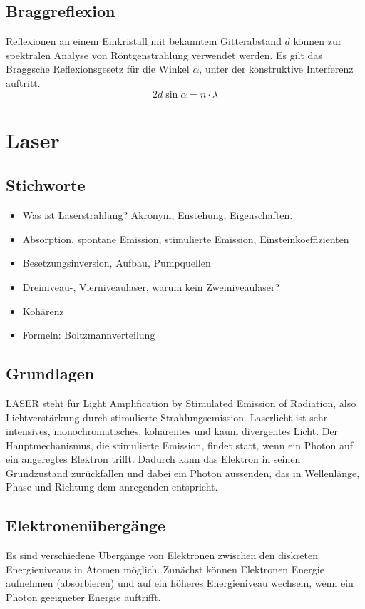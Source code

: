 \documentclass[a4paper]{scrartcl}
\begin{document}
\subsection{Braggreflexion}
Reflexionen an einem Einkristall mit bekanntem Gitterabstand $d$ können zur spektralen Analyse von Röntgenstrahlung verwendet werden. Es gilt das Braggsche Reflexionsgesetz für die Winkel $\alpha$, unter der konstruktive Interferenz auftritt.
\begin{equation*}
  2d\sin\alpha = n\cdot\lambda
  \label{equ:Bragg}
\end{equation*}


\section{Laser}

\subsection{Stichworte}
\begin{itemize}[noitemsep]
  \item Was ist Laserstrahlung? Akronym, Enstehung, Eigenschaften.
  \item Absorption, spontane Emission, stimulierte Emission, Einsteinkoeffizienten
  \item Besetzungsinversion, Aufbau, Pumpquellen
  \item Dreiniveau-, Vierniveaulaser, warum kein Zweiniveaulaser?
  \item Kohärenz
  \item Formeln: Boltzmannverteilung
\end{itemize}

\subsection{Grundlagen}
LASER steht für Light Amplification by Stimulated Emission of Radiation, also Lichtverstärkung durch stimulierte Strahlungsemission. Laserlicht ist sehr intensives, monochromatisches, kohärentes und kaum divergentes Licht. Der Hauptmechanismus, die stimulierte Emission, findet statt, wenn ein Photon auf ein angeregtes Elektron trifft. Dadurch kann das Elektron in seinen Grundzustand zurückfallen und dabei ein Photon aussenden, das in Wellenlänge, Phase und Richtung dem anregenden entspricht.

\subsection{Elektronenübergänge}
Es sind verschiedene Übergänge von Elektronen zwischen den diskreten Energieniveaus in Atomen möglich. Zunächst können Elektronen Energie aufnehmen (absorbieren) und auf ein höheres Energieniveau wechseln, wenn ein Photon geeigneter Energie auftrifft.
\end{document}
